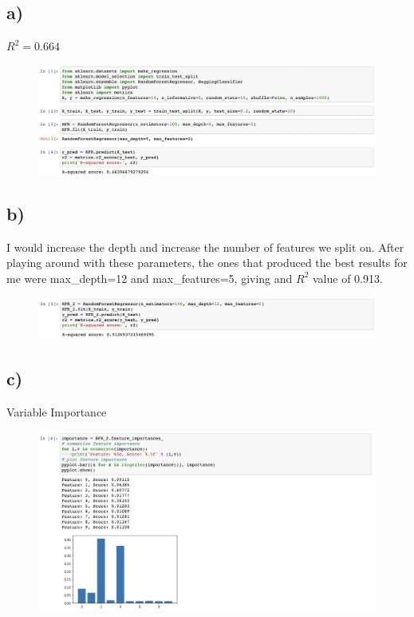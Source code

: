 \documentclass[12pt, letterpaper]{article}
\begin{document}
\subsection*{a)} $R^2=0.664$
\begin{figure}[h!]
  \includegraphics[scale=0.4]{./images/4a}
\end{figure}

\subsection*{b)}I would increase the depth and increase the number of features we split on. After playing around with these parameters, the ones that produced the best results for me were max\_depth=12 and max\_features=5, giving and $R^2$ value of 0.913.\\
\begin{figure}[h!]
  \includegraphics[scale=0.4]{./images/4b}
\end{figure}

\subsection*{c)} Variable Importance
\begin{figure}[h!]
  \includegraphics[scale=0.4]{./images/4c}
\end{figure}
\clearpage
\end{document}
